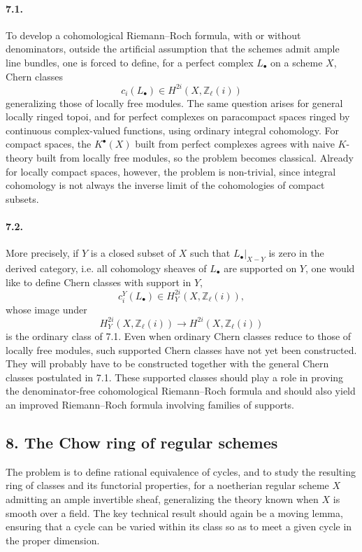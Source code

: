 \documentclass[12pt]{article}
\newcommand{\ZZ}{\mathbb Z}
\newcommand{\longto}{\longrightarrow}
\begin{document}
\paragraph{7.1.}
To develop a cohomological Riemann--Roch formula, with or without denominators, outside the artificial assumption that the schemes admit ample line bundles, one is forced to define, for a perfect complex $L_\bullet$ on a scheme $X$, Chern classes
\[
c_i(L_\bullet)\in H^{2i}(X,\ZZ_\ell(i))
\]
generalizing those of locally free modules. The same question arises for general locally ringed topoi, and for perfect complexes on paracompact spaces ringed by continuous complex-valued functions, using ordinary integral cohomology. For compact spaces, the $K^\bullet(X)$ built from perfect complexes agrees with naive $K$-theory built from locally free modules, so the problem becomes classical. Already for locally compact spaces, however, the problem is non-trivial, since integral cohomology is not always the inverse limit of the cohomologies of compact subsets.

\paragraph{7.2.}
More precisely, if $Y$ is a closed subset of $X$ such that $L_\bullet|_{X-Y}$ is zero in the derived category, i.e. all cohomology sheaves of $L_\bullet$ are supported on $Y$, one would like to define Chern classes with support in $Y$,
\[
c_i^Y(L_\bullet)\in H_Y^{2i}(X,\ZZ_\ell(i)),
\]
whose image under
\[
H_Y^{2i}(X,\ZZ_\ell(i))\longto H^{2i}(X,\ZZ_\ell(i))
\]
is the ordinary class of 7.1. Even when ordinary Chern classes reduce to those of locally free modules, such supported Chern classes have not yet been constructed. They will probably have to be constructed together with the general Chern classes postulated in 7.1. These supported classes should play a role in proving the denominator-free cohomological Riemann--Roch formula and should also yield an improved Riemann--Roch formula involving families of supports.

\subsection*{8. The Chow ring of regular schemes}

The problem is to define rational equivalence of cycles, and to study the resulting ring of classes and its functorial properties, for a noetherian regular scheme $X$ admitting an ample invertible sheaf, generalizing the theory known when $X$ is smooth over a field. The key technical result should again be a moving lemma, ensuring that a cycle can be varied within its class so as to meet a given cycle in the proper dimension.
\end{document}
